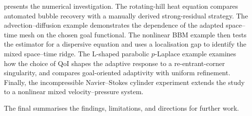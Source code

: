  presents the numerical investigation. The rotating-hill heat equation compares automated bubble recovery with a manually derived strong-residual strategy. The advection--diffusion example demonstrates the dependence of the adapted space--time mesh on the chosen goal functional. The nonlinear BBM example then tests the estimator for a dispersive equation and uses a localisation gap to identify the mixed space--time ridge. The L-shaped parabolic \(p\)-Laplace example examines how the choice of QoI shapes the adaptive response to a re-entrant-corner singularity, and compares goal-oriented adaptivity with uniform refinement. Finally, the incompressible Navier--Stokes cylinder experiment extends the study to a nonlinear mixed velocity--pressure system.

The final  summarises the findings, limitations, and directions for further work.
